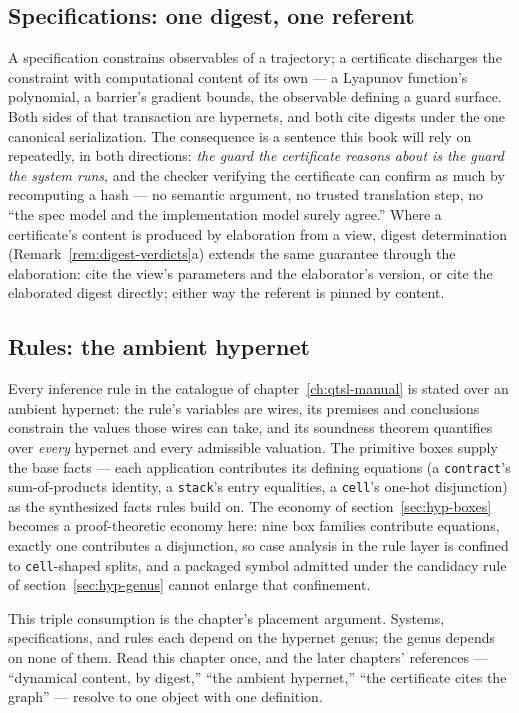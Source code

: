 \subsection*{Specifications: one digest, one referent}

A specification constrains observables of a trajectory; a certificate
discharges the constraint with computational content of its own ---
a Lyapunov function's polynomial, a barrier's gradient bounds, the
observable defining a guard surface. Both sides of that transaction
are hypernets, and both cite digests under the one canonical
serialization. The consequence is a sentence this book will rely on
repeatedly, in both directions: \emph{the guard the certificate
reasons about is the guard the system runs}, and the checker
verifying the certificate can confirm as much by recomputing a hash
--- no semantic argument, no trusted translation step, no ``the spec
model and the implementation model surely agree.'' Where a
certificate's content is produced by elaboration from a view, digest
determination (Remark~\ref{rem:digest-verdicts}a) extends the same
guarantee through the elaboration: cite the view's parameters and the
elaborator's version, or cite the elaborated digest directly; either
way the referent is pinned by content.

\subsection*{Rules: the ambient hypernet}

Every inference rule in the catalogue of chapter~\ref{ch:qtsl-manual}
is stated over an ambient hypernet: the rule's variables are wires,
its premises and conclusions constrain the values those wires can
take, and its soundness theorem quantifies over \emph{every}
hypernet and every admissible valuation. The primitive boxes supply
the base facts --- each application contributes its defining
equations (a \texttt{contract}'s sum-of-products identity, a
\texttt{stack}'s entry equalities, a \texttt{cell}'s one-hot
disjunction) as the synthesized facts rules build on. The economy of
section~\ref{sec:hyp-boxes} becomes a proof-theoretic economy here:
nine box families contribute equations, exactly one contributes a
disjunction, so case analysis in the rule layer is confined to
\texttt{cell}-shaped splits, and a packaged symbol admitted under the
candidacy rule of section~\ref{sec:hyp-genus} cannot enlarge that
confinement.

\medskip

This triple consumption is the chapter's placement argument. Systems,
specifications, and rules each depend on the hypernet genus; the
genus depends on none of them. Read this chapter once, and the later
chapters' references --- ``dynamical content, by digest,''
``the ambient hypernet,'' ``the certificate cites the graph'' ---
resolve to one object with one definition.

